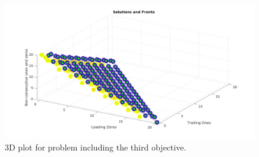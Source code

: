 \documentclass{article}
\begin{document}
\begin{enumerate}
	\begin{figure}[h!]
		\centering
		\includegraphics[width=0.99\textwidth]{resource/output.png}
		\caption{3D plot for problem including the third objective.}
		\end{figure}
	{\color{blue}
		
	}
\end{enumerate}
\end{document}
